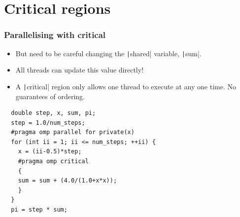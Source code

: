 \documentclass[aspectratio=169]{beamer}
\begin{document}
\section{Critical regions}
\begin{frame}[fragile]
\frametitle{Parallelising with critical}
\begin{itemize}
  \item But need to be careful changing the \texttt|shared| variable, \texttt|sum|.
  \item All threads can update this value directly!
  \item A \texttt|critical| region only allows one thread to execute at any one time. No guarantees of ordering.
\end{itemize}

\begin{verbatim}
  double step, x, sum, pi;
  step = 1.0/num_steps;
  #pragma omp parallel for private(x)
  for (int ii = 1; ii <= num_steps; ++ii) {
    x = (ii-0.5)*step;
    #pragma omp critical
    {
    sum = sum + (4.0/(1.0+x*x));
    }
  }
  pi = step * sum;
\end{verbatim}

\end{frame}
\end{document}
